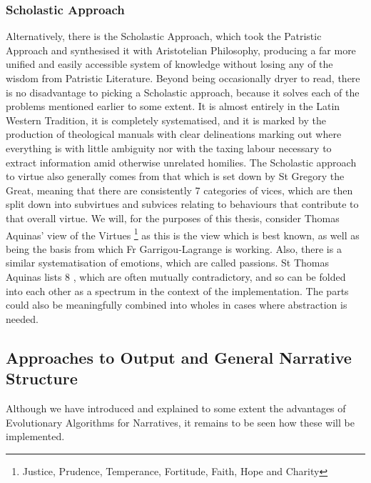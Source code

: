 \documentclass[11pt]{article}
\begin{document}
\subsubsection{Scholastic Approach} 
Alternatively, there is the Scholastic Approach, which took the Patristic Approach and synthesised it with Aristotelian Philosophy, producing a far more unified and easily accessible system of knowledge without losing any of the wisdom from Patristic Literature. Beyond being occasionally dryer to read, there is no disadvantage to picking a Scholastic approach, because it solves each of the problems mentioned earlier to some extent. It is almost entirely in the Latin Western Tradition, it is completely systematised, and it is marked by the production of theological manuals with clear delineations marking out where everything is with little ambiguity nor with the taxing labour necessary to extract information amid otherwise unrelated homilies. The Scholastic approach to virtue also generally comes from that which is set down by St Gregory the Great, meaning that there are consistently 7 categories of vices, which are then split down into subvirtues and subvices relating to behaviours that contribute to that overall virtue. We will, for the purposes of this thesis, consider Thomas Aquinas' view of the Virtues \footnote{Justice, Prudence, Temperance, Fortitude, Faith, Hope and Charity} as this is the view which is best known, as well as being the basis from which Fr Garrigou-Lagrange is working. Also, there is a similar systematisation of emotions, which are called passions. St Thomas Aquinas lists 8 \cite{ThomasAq85:online}, which are often mutually contradictory, and so can be folded into each other as a spectrum in the context of the implementation. The parts could also be meaningfully combined into wholes in cases where abstraction is needed.\\
\subsection{Approaches to Output and General Narrative Structure}
Although we have introduced and explained to some extent the advantages of Evolutionary Algorithms for Narratives, it remains to be seen how these will be implemented.\\
\end{document}
